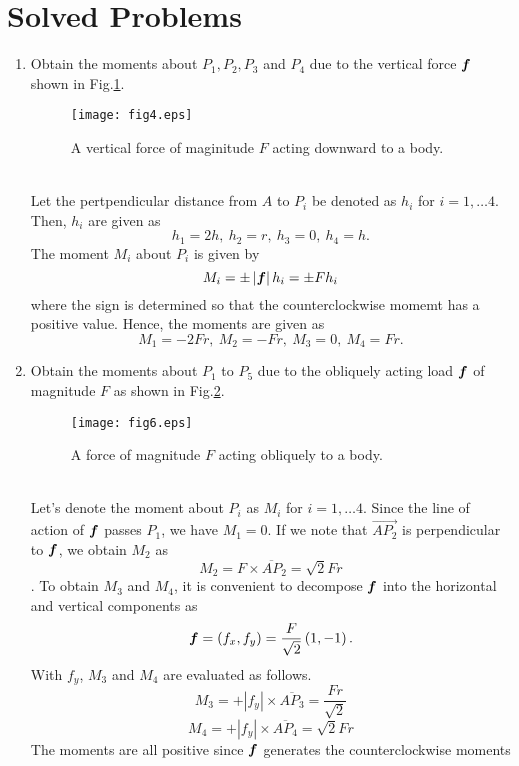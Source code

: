 \documentclass[10pt,a4j]{article}
\begin{document}
\section{Solved Problems}
\begin{enumerate}
\item
	Obtain the moments about $P_1,P_2,P_3$ and $P_4$ due to the vertical
	force $\mbox{\boldmath $f$}$ shown in Fig.\ref{fig:fig4}.
	\begin{figure}[h]
		\begin{center}
		\texttt{[image: fig4.eps]} 
		\end{center}
		\caption{A vertical force of maginitude $F$ acting downward to a body.} 
		\label{fig:fig4}
	\end{figure}
	\\

	{\small
		Let the pertpendicular distance from $A$ to $P_i$ be denoted as $h_i$ for $i=1,\dots 4$. 
		Then, $h_i$ are given as 
		\[
			h_1=2h, \ h_2=r, \ h_3=0, \ h_4=h.
		\]
		The moment $M_i$ about $P_i$ is given by 
		\[
			M_i=\pm \left| \mbox{\boldmath $f$} \right| h_i= \pm Fh_i
		\]	
		where the sign is determined so that the counterclockwise momemt has a positive value.
		Hence, the moments are given as
		\[
			M_1=-2Fr, \ M_2=-Fr, \ M_3=0, \ M_4=Fr.
		\]
	}
\item
	Obtain the moments about $P_1$ to $P_5$ due to the obliquely acting load $\mbox{\boldmath $f$}$ 
	of magnitude $F$ as shown in Fig.\ref{fig:fig6}.
	\begin{figure}[h]
		\begin{center}
		\texttt{[image: fig6.eps]} 
		\end{center}
		\caption{A force of magnitude $F$ acting obliquely to a body.} 
		\label{fig:fig6}
	\end{figure}
	\\
	{\small
		Let's denote the moment about $P_i$ as $M_i$ for $i=1,\dots 4$.
		Since the line of action of $\mbox{\boldmath $f$}$ passes $P_1$, we have $M_1=0$.
		If we note that $\overrightarrow{AP_2}$ is perpendicular to $\mbox{\boldmath $f$}$, 
		we obtain $M_2$ as 
		\[ 
			M_2=F\times \overline{AP}_2=\sqrt{2}Fr
		\].
		To obtain $M_3$ and $M_4$, it is convenient to decompose $\mbox{\boldmath $f$}$ into 
		the horizontal and vertical components as 
		\[
			\mbox{\boldmath $f$}=(f_x,f_y)=\frac{F}{\sqrt{2}}\left(1, -1\right).
		\]
		With $f_y$, $M_3$ and $M_4$ are evaluated as follows.
		\[
			M_3=+\left|f_y\right| \times \overline{A P_3}=\frac{Fr}{\sqrt{2}}
		\]
		\[
			M_4=+\left|f_y \right| \times \overline{A P_4}=\sqrt{2}Fr
		\]
		The moments are all positive since $\mbox{\boldmath $f$}$ generates the counterclockwise moments 
}
\end{enumerate}
\end{document}
